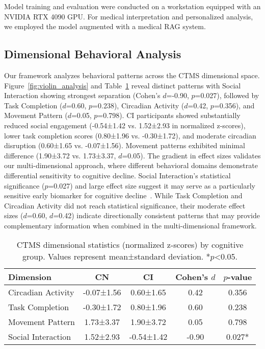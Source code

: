 \documentclass[sigconf, anonymous, 9pt, nonacm]{acmart}
\begin{document}
Model training and evaluation were conducted on a workstation equipped with an NVIDIA RTX 4090 GPU. For medical interpretation and personalized analysis, we employed the  model augmented with a medical RAG system. 



\subsection{Dimensional Behavioral Analysis}

Our framework analyzes behavioral patterns across the CTMS dimensional space. Figure~\ref{fig:violin_analysis} and Table~\ref{tab:dimensional_stats} reveal distinct patterns with Social Interaction showing strongest separation (Cohen's $d$=-0.90, $p$=0.027), followed by Task Completion ($d$=0.60, $p$=0.238), Circadian Activity ($d$=0.42, $p$=0.356), and Movement Pattern ($d$=0.05, $p$=0.798).
CI participants showed substantially reduced social engagement (-0.54±1.42 vs. 1.52±2.93 in normalized z-scores), lower task completion scores (0.80±1.96 vs. -0.30±1.72), and moderate circadian disruption (0.60±1.65 vs. -0.07±1.56). Movement patterns exhibited minimal difference (1.90±3.72 vs. 1.73±3.37, $d$=0.05). The gradient in effect sizes validates our multi-dimensional approach, where different behavioral domains demonstrate differential sensitivity to cognitive decline. Social Interaction's statistical significance ($p$=0.027) and large effect size suggest it may serve as a particularly sensitive early biomarker for cognitive decline~\cite{Shafighi2023SocialIsolationAD}. While Task Completion and Circadian Activity did not reach statistical significance, their moderate effect sizes ($d$=0.60, $d$=0.42) indicate directionally consistent patterns that may provide complementary information when combined in the multi-dimensional framework.


\begin{table}[t]
\centering
\small
\begin{tabular}{lcccc}
\toprule
\textbf{Dimension} & \textbf{CN} & \textbf{CI} & \textbf{Cohen's $d$} & \textbf{$p$-value} \\
\midrule
Circadian Activity & -0.07±1.56 & 0.60±1.65 & 0.42 & 0.356 \\
Task Completion & -0.30±1.72 & 0.80±1.96 & 0.60 & 0.238 \\
Movement Pattern & 1.73±3.37 & 1.90±3.72 & 0.05 & 0.798 \\
Social Interaction & 1.52±2.93 & -0.54±1.42 & -0.90 & 0.027* \\
\bottomrule
\end{tabular}
\caption{CTMS dimensional statistics (normalized z-scores) by cognitive group. Values represent mean±standard deviation. *$p$<0.05.}
\label{tab:dimensional_stats}
\vspace{-3em}
\end{table}
\end{document}
